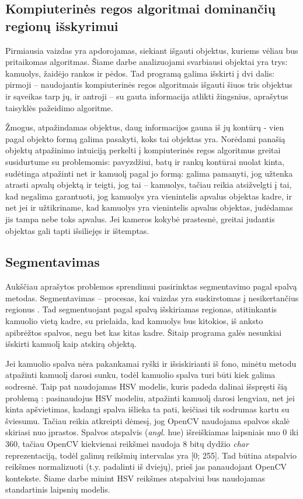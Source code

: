 \documentclass{VUMIFPSkursinis}
\begin{document}
\subsection{Kompiuterinės regos algoritmai dominančių regionų išskyrimui}
Pirmiausia vaizdas yra apdorojamas, siekiant išgauti objektus, kuriems vėliau bus pritaikomas algoritmas. Šiame darbe analizuojami svarbiausi objektai yra trys: kamuolys, žaidėjo rankos ir pėdos. Tad programą galima išskirti į dvi dalis: pirmoji – naudojantis kompiuterinės regos algoritmais išgauti šiuos tris objektus ir sąveikas tarp jų, ir antroji – su gauta informacija atlikti žingsnius, aprašytus taisyklės pažeidimo algoritme. 

Žmogus, atpažindamas objektus, daug informacijos gauna iš jų kontūrų - vien pagal objekto formą galima pasakyti, koks tai objektas yra. Norėdami panašią objektų atpažinimo intuiciją perkelti į kompiuterinės regos algoritmus greitai susidurtume su problemomis: pavyzdžiui, batų ir rankų kontūrai nuolat kinta, sudėtinga atpažinti net ir kamuolį pagal jo formą: galima pamanyti, jog užtenka atrasti apvalų objektą ir teigti, jog tai – kamuolys, tačiau reikia atsižvelgti į tai, kad negalima garantuoti, jog kamuolys yra vienintelis apvalus objektas kadre, ir net jei ir užtikriname, kad kamuolys yra vienintelis apvalus objektas, judėdamas jis tampa nebe toks apvalus. Jei kameros kokybė prastesnė, greitai judantis objektas gali tapti išsiliejęs ir ištemptas.

\subsection{Segmentavimas}
Aukščiau aprašytos problemos sprendimui pasirinktas segmentavimo pagal spalvą metodas. Segmentavimas – procesas, kai vaizdas yra suskirstomas į nesikertančius regionus \cite{ImageSegmTech}. Tad segmentuojant pagal spalvą išskiriamas regionas, atitinkantis kamuolio vietą kadre, su prielaida, kad kamuolys bus kitokios, iš anksto apibrėžtos spalvos, negu bet kas kitas kadre. Šitaip programa galės nesunkiai išskirti kamuolį kaip atskirą objektą. 

Jei kamuolio spalva nėra pakankamai ryški ir išsiskirianti iš fono, minėtu metodu atpažinti kamuolį darosi sunku, todėl kamuolio spalva turi būti kiek galima sodresnė. Taip pat naudojamas HSV modelis, kuris padeda dalinai išspręsti šią problemą \cite{StaloTenisas}: pasinaudojus HSV modeliu, atpažinti kamuolį darosi lengviau, net jei kinta apšvietimas, kadangi spalva išlieka ta pati, keičiasi tik sodrumas kartu su šviesumu. Tačiau reikia atkreipti dėmesį, jog OpenCV naudojama spalvos skalė skiriasi nuo įprastos. Spalvos atspalvis (\textit{angl.} hue) išreiškiamas laipsniais nuo 0 iki 360, tačiau OpenCV kiekvienai reikšmei naudoja 8 bitų dydžio \textit{char} reprezentaciją, todėl galimų reikšmių intervalas yra [0; 255]. Tad būtina atspalvio reikšmes normalizuoti (t.y. padalinti iš dviejų), prieš jas panaudojant OpenCV kontekste. Šiame darbe minint HSV reikšmes atspalviui bus naudojamas standartinis laipsnių modelis.
\end{document}
